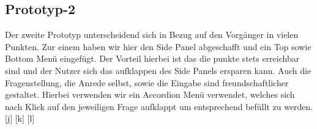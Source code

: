 \documentclass[runningheads,a4paper]{llncs}
\begin{document}
\clearpage
\subsection{Prototyp-2}

Der zweite Prototyp unterscheidend sich in Bezug auf den Vorgänger in vielen Punkten. Zur einem haben wir hier den Side Panel abgeschafft und ein Top sowie Bottom Menü eingefügt. Der Vorteil hierbei ist das die punkte stets erreichbar sind und der Nutzer sich das aufklappen des Side Panels ersparen kann. Auch die Fragenstellung, die Anrede selbst, sowie die Eingabe sind freundschaftlicher gestaltet. Hierbei verwenden wir ein Accordion Menü verwendet, welches sich nach Klick auf den jeweiligen Frage aufklappt um entsprechend befüllt zu werden. [j] [k] [l] 

\begin{figure}
\centering
{}
\hfill
{}
\hfill
{}
\vfill
{}

\end{figure}
\end{document}
